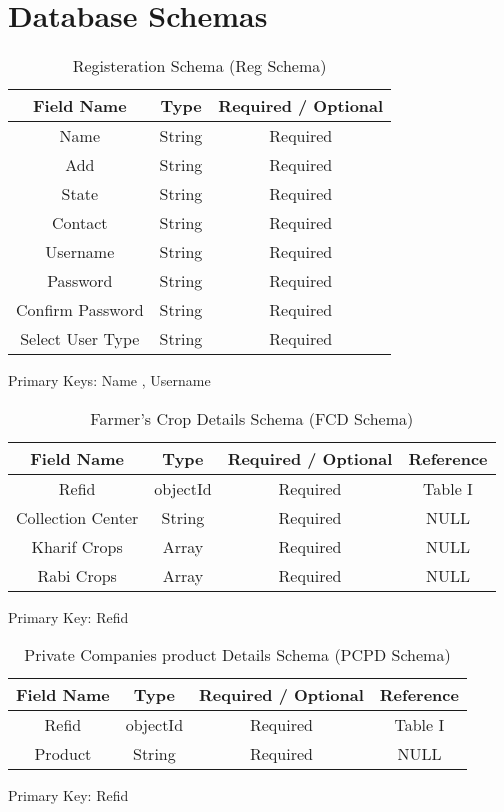 \documentclass[conference]{IEEEtran}
\begin{document}
\section{Database Schemas} \label{Database Schemas}
\begin{table}[htbp]
\caption{Registeration Schema (Reg Schema)}
\centering
\begin{tabular}{|c|c|c|} 
\hline
\textbf{Field Name} & \textbf{Type}& \textbf{Required / Optional} \\
\hline
Name & String & Required\\
\hline
Add & String & Required\\
\hline
State & String & Required\\
\hline
Contact & String & Required\\
\hline
Username & String & Required\\
\hline
Password & String & Required\\
\hline
Confirm Password & String & Required\\
\hline
Select User Type & String & Required\\
\hline
\end{tabular}
\label{table1}
\begin{center}
Primary Keys: Name , Username
\end{center}
\end{table}
\raggedbottom



\begin{table}[htbp]
\caption{Farmer's Crop Details Schema (FCD Schema)}
\centering
\begin{tabular}{|c|c|c|c|} 
\hline
\textbf{Field Name} & \textbf{Type}& \textbf{Required / Optional} & \textbf{Reference} \\
\hline
Refid & objectId & Required & Table I \\
\hline
Collection Center & String & Required & NULL\\
\hline
Kharif Crops & Array & Required & NULL\\
\hline
Rabi Crops & Array & Required & NULL\\
\hline
\end{tabular}
\label{table3}
\begin{center}
Primary Key: Refid 
\end{center}
\end{table}
\raggedbottom

\begin{table}[htbp]
\caption{Private Companies product Details Schema (PCPD Schema)}
\centering
\begin{tabular}{|c|c|c|c|} 
\hline
\textbf{Field Name} & \textbf{Type}& \textbf{Required / Optional} & \textbf{Reference} \\
\hline
Refid & objectId & Required & Table I \\
\hline
Product & String & Required & NULL\\
\hline
\end{tabular}
\label{table2}
\begin{center}
Primary Key: Refid
\end{center}
\end{table}
\raggedbottom
\end{document}
